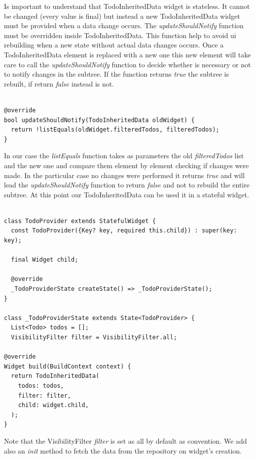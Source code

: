 Is important to understand that TodoInheritedData widget is stateless. It cannot be changed (every value is final) but instead a new TodoInheritedData widget must be provided when a data change occurs. 
The \textit{updateShouldNotify }function must be overridden inside TodoInheritedData. This function help to avoid ui rebuilding when a new state without actual data changes occurs. Once a TodoInheritedData element is replaced with a new one this new element will take care to call the \textit{updateShouldNotify }function to decide whether is necessary or not to notify changes in the subtree. If the function returns \textit{true }the subtree is rebuilt, if return \textit{false} instead is not.
\mbox{}\\


\begin{verbatim}

@override
bool updateShouldNotify(TodoInheritedData oldWidget) {
  return !listEquals(oldWidget.filteredTodos, filteredTodos);
}
\end{verbatim}
In our case the \textit{listEquals }function takes as parameters the old \textit{filteredTodos} list and the new one and compare them element by element checking if changes were made. In the particular case no changes were performed it returns \textit{true} and will lead the \textit{updateShouldNotify }function to return \textit{false} and not to rebuild the entire subtree.
At this point our TodoInheritedData can be used it in a stateful widget.


\begin{verbatim}

class TodoProvider extends StatefulWidget {
  const TodoProvider({Key? key, required this.child}) : super(key: key);

  final Widget child;

  @override
  _TodoProviderState createState() => _TodoProviderState();
}

class _TodoProviderState extends State<TodoProvider> {
  List<Todo> todos = [];
  VisibilityFilter filter = VisibilityFilter.all;

@override
Widget build(BuildContext context) {
  return TodoInheritedData(
    todos: todos,
    filter: filter,
    child: widget.child,
  );
}
\end{verbatim}

Note that the VisibilityFilter \textit{filter} is set as all by default as convention.
We add also an \textit{init} method to fetch the data from the repository on widget’s creation.
\mbox{}\\


